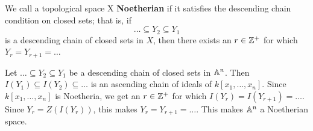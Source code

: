 \begin{definition}
    We call a topological space X \textbf{Noetherian} if it satisfies
    the descending chain condition on closed sets; that is, if
    \begin{equation*}
        \dots \subseteq Y_2 \subseteq Y_1
    \end{equation*}
    is a descending chain of closed sets in $X$, then there exists an  $r \in
    \mathbb{Z}^+$ for which  $Y_r=Y_{r+1}=\dots$
\end{definition}

\begin{example}\label{example_1.5}
    Let $\dots \subseteq Y_2 \subseteq Y_1$ be a descending chain of closed sets
    in $\mathbb{A}^n$. Then  $I(Y_1) \subseteq I(Y_2) \subseteq \dots$ is an ascending
    chain of ideals of $k[x_1, \dots, x_n]$. Since $k[x_1, \dots, x_n]$ is
    Noetheria, we get an $r \in \mathbb{Z}^+$ for which  $I(Y_r)=I(Y_{r+1})=\dots$.
    Since $Y_r=Z(I(Y_r))$, this makes $Y_r=Y_{r+1}=\dots$. This makes $\mathbb{A}^n$ a
    Noetherian space.
\end{example}

